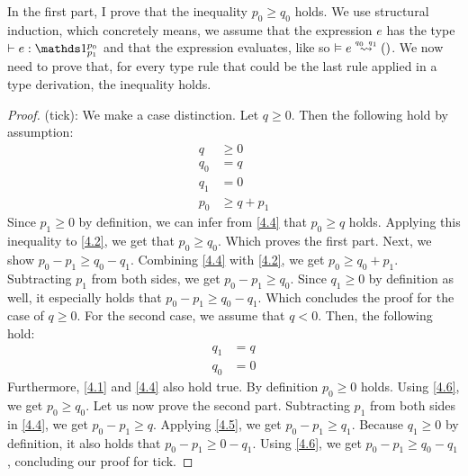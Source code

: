 In the first part, I prove that the inequality \(p_0 \geq q_0\) holds. We use structural induction, which concretely means, we assume that the expression \(e\) has the type \(\typing{}{e}{\ratype{\unit}{p_0}{p_1}}\) and that the expression evaluates, like so \(\evals{}{e}{()}{q_0}{q_1}\). We now need to prove that, for every type rule that could be the last rule applied in a type derivation, the inequality holds.

\begin{proof}
   (tick): We make a case distinction. Let \(q \geq 0\). Then the following hold by assumption:
   \begin{align}
      q     &\geq 0 \label{4.1}\\
      q_0   &= q \label{4.2}\\
      q_1   &= 0 \label{4.3}\\
      p_0   &\geq q + p_1 \label{4.4}
   \end{align}
   Since \(p_1 \geq 0\) by definition, we can infer from \ref{4.4} that \(p_0 \geq q\) holds. Applying this inequality to \ref{4.2}, we get that \(p_0 \geq q_0\). Which proves the first part.
   Next, we show \(p_0 - p_1 \geq q_0 - q_1\). Combining \ref{4.4} with \ref{4.2}, we get \(p_0 \geq q_0 + p_1\). Subtracting \(p_1\) from both sides, we get \(p_0 - p_1 \geq q_0\). Since \(q_1 \geq 0\) by definition as well, it especially holds that \(p_0 - p_1 \geq q_0 - q_1\). Which concludes the proof for the case of \(q \geq 0\).
   For the second case, we assume that \(q < 0\). Then, the following hold:
   \begin{align}
      q_1   &= q \label{4.5}\\
      q_0   &= 0 \label{4.6}
   \end{align}
   Furthermore, \ref{4.1} and \ref{4.4} also hold true. By definition \(p_0 \geq 0\) holds. Using \ref{4.6}, we get \(p_0 \geq q_0\). 
   Let us now prove the second part. Subtracting \(p_1\) from both sides in \ref{4.4}, we get \(p_0 - p_1 \geq q \). Applying \cref{4.5}, we get \(p_0 - p_1 \geq q_1\). Because \(q_1 \geq 0\) by definition, it also holds that \(p_0 - p_1 \geq 0 - q_1\). Using \ref{4.6}, we get \(p_0 - p_1 \geq q_0 - q_1\), concluding our proof for tick.
      

\end{proof}
